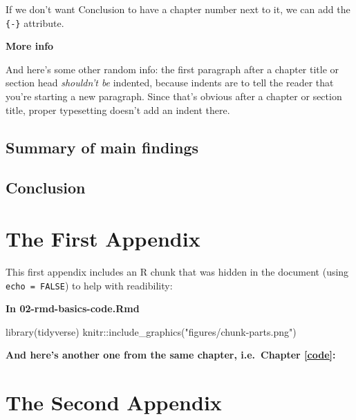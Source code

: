 \documentclass[a4paper, twoside]{templates/ociamthesis}
\newenvironment{Shaded}{\begin{snugshade}}{\end{snugshade}}
\newcommand{\FunctionTok}[1]{\textcolor[rgb]{0.00,0.00,0.00}{#1}}
\newcommand{\NormalTok}[1]{#1}
\newcommand{\SpecialCharTok}[1]{\textcolor[rgb]{0.00,0.00,0.00}{#1}}
\newcommand{\StringTok}[1]{\textcolor[rgb]{0.31,0.60,0.02}{#1}}
\renewenvironment{Shaded}
{
  \vspace{4pt}%
  \begin{snugshade}%
}{%
  \end{snugshade}%
  \vspace{4pt}%
}
\begin{document}
If we don't want Conclusion to have a chapter number next to it, we can add the \texttt{\{-\}} attribute.

\textbf{More info}

And here's some other random info: the first paragraph after a chapter title or section head \emph{shouldn't be} indented, because indents are to tell the reader that you're starting a new paragraph. Since that's obvious after a chapter or section title, proper typesetting doesn't add an indent there.

\hypertarget{summary-of-main-findings}{%
\section*{Summary of main findings}\label{summary-of-main-findings}}

\hypertarget{conclusion-3}{%
\section*{Conclusion}\label{conclusion-3}}

\startappendices

\hypertarget{the-first-appendix}{%
\chapter{The First Appendix}\label{the-first-appendix}}

This first appendix includes an R chunk that was hidden in the document (using \texttt{echo\ =\ FALSE}) to help with readibility:

\textbf{In 02-rmd-basics-code.Rmd}

\begin{Shaded}
\begin{Highlighting}[]
\FunctionTok{library}\NormalTok{(tidyverse)}
\NormalTok{knitr}\SpecialCharTok{::}\FunctionTok{include\_graphics}\NormalTok{(}\StringTok{"figures/chunk{-}parts.png"}\NormalTok{)}
\end{Highlighting}
\end{Shaded}

\textbf{And here's another one from the same chapter, i.e.~Chapter \ref{code}:}

\hypertarget{the-second-appendix}{%
\chapter{The Second Appendix}\label{the-second-appendix}}
\end{document}
